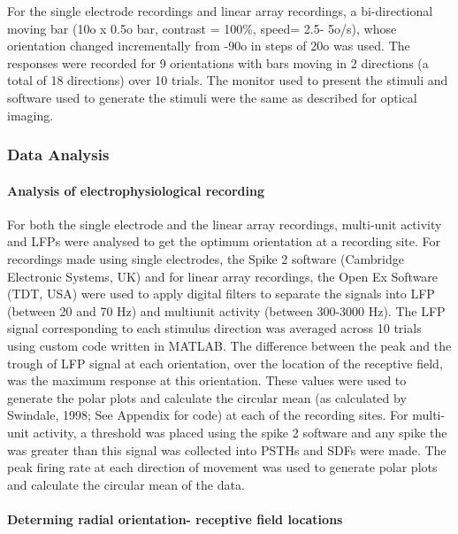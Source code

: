 		For the single electrode recordings and linear array recordings, a bi-directional moving bar (10o x 0.5o bar, contrast = 100\%, speed= 2.5- 5o/s), whose orientation changed incrementally from -90o in steps of 20o was used. The responses were recorded for 9 orientations with bars moving in 2 directions (a total of 18 directions) over 10 trials. The monitor used to present the stimuli and software used to generate the stimuli were the same as described for optical imaging.
		
	\subsubsection{Data Analysis}
	
		\paragraph{Analysis of electrophysiological recording}
		
		For both the single electrode and the linear array recordings, multi-unit activity and LFPs were analysed to get the optimum orientation at a recording site. For recordings made using single electrodes, the Spike 2 software (Cambridge Electronic Systems, UK) and for linear array recordings, the Open Ex Software (TDT, USA) were used to apply digital filters to separate the signals into LFP (between 20 and 70 Hz) and multiunit activity (between 300-3000 Hz).  The LFP signal corresponding to each stimulus direction was averaged across 10 trials using custom code written in MATLAB. The difference between the peak and the trough of LFP signal at each orientation, over the location of the receptive field, was the maximum response at this orientation. These values were used to generate the polar plots and calculate the circular mean (as calculated by Swindale, 1998; See Appendix for code) at each of the recording sites. For multi-unit activity, a threshold was placed using the spike 2 software and any spike the was greater than this signal was collected into PSTHs and SDFs were made. The peak firing rate at each direction of movement was used to generate polar plots and calculate the circular mean of the data.
		
		\paragraph{Determing radial orientation- receptive field locations}
		
